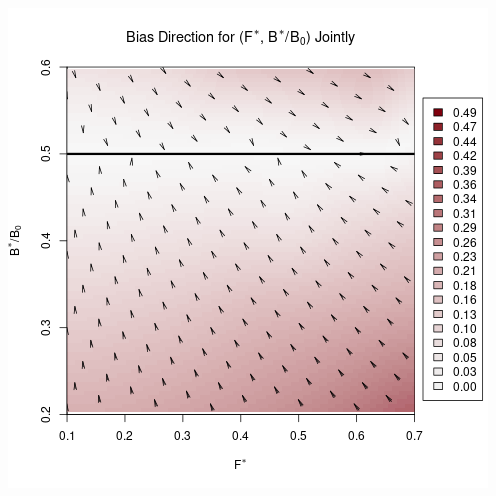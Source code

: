 \documentclass[ xcolor = pdftex, dvipsnames, table ]{beamer}
\begin{document}
%
\begin{frame}
\begin{center}
\includegraphics[height=\textheight]{../../.././nick/gpBias/directionalBiasPellaFlatNoQ.png}
\end{center}
\end{frame}
\end{document}

